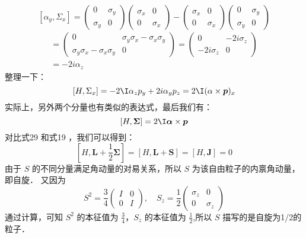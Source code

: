 \begin{equation}
\left[\alpha_{y}, \Sigma_{x}\right] = \left(\begin{array}{cc}
0 & \sigma_{y} \\
\sigma_{y} & 0
\end{array}\right)\left(\begin{array}{cc}
\sigma_{x} & 0 \\
0 & \sigma_{x}
\end{array}\right)-\left(\begin{array}{cc}
\sigma_{x} & 0 \\
0 & \sigma_{x}
\end{array}\right)\left(\begin{array}{cc}
0 & \sigma_{y} \\
\sigma_{y} & 0
\end{array}\right)
\end{equation}
\begin{equation}
\begin{array}{l}
=\left(\begin{array}{cc}
0 & \sigma_{y} \sigma_{x}-\sigma_{x} \sigma_{y} \\
\sigma_{y} \sigma_{x}-\sigma_{x} \sigma_{y} & 0
\end{array}\right)=\left(\begin{array}{cc}
0 & -2 i \sigma_{z} \\
-2 i \sigma_{z} & 0
\end{array}\right) \\
=-2 i \alpha_{z}
\end{array}
\end{equation}
整理一下：
\begin{equation}
\left[H, \Sigma_{x}\right]=-2  \I \alpha_{z} p_{y}+2 i \alpha_{y} p_{z}=2  \I(\alpha \times \boldsymbol{p})_{x}
\end{equation}
实际上，另外两个分量也有类似的表达式，最后我们有：
\begin{equation}\label{qed4_eq19}
[H, \mathbf{\Sigma}]=2  \I \boldsymbol{\alpha} \times \boldsymbol{p}
\end{equation}
对比式29 和式19 ，我们可以得到：
\begin{equation}
\left[H, \boldsymbol{L}+\frac{1}{2} \boldsymbol{\Sigma}\right]=[H, \boldsymbol{L}+\boldsymbol{S}]=[H, \boldsymbol{J}]=0
\end{equation}
由于 $S$ 的不同分量满足角动量的对易关系，所以 $S$ 为该自由粒子的内禀角动量，即自旋．
又因为
\begin{equation}
S^{2}=\frac{3}{4}\left(\begin{array}{ll}
I & 0 \\
0 & I
\end{array}\right), \quad S_{z}=\frac{1}{2}\left(\begin{array}{cc}
\sigma_{z} & 0 \\
0 & \sigma_{z}
\end{array}\right)
\end{equation}
通过计算，可知 $S^2$ 的本征值为 $\frac{3}{4}$，$S_{z}$ 的本征值为 $\frac{1}{2}$,所以 $S$ 描写的是自旋为1/2的粒子．

